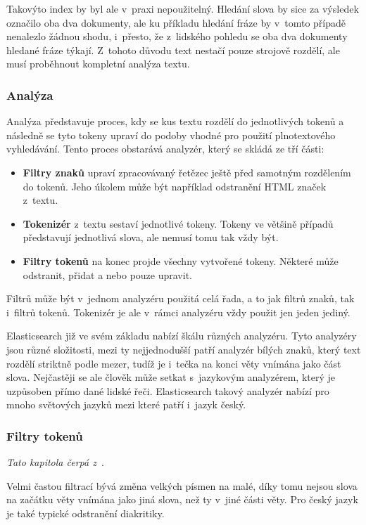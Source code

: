 Takovýto index by byl ale v~praxi nepoužitelný. Hledání slova  by sice za výsledek označilo oba dva dokumenty, ale ku příkladu hledání fráze  by v~tomto případě nenalezlo žádnou shodu, i~přesto, že z~lidského pohledu se oba dva dokumenty hledané fráze týkají. Z~tohoto důvodu text nestačí pouze strojově rozdělí, ale musí proběhnout kompletní analýza textu.

\subsubsection*{Analýza}
Analýza představuje proces, kdy se kus textu rozdělí do jednotlivých tokenů a následně se tyto tokeny upraví do podoby vhodné pro použití plnotextového vyhledávání. Tento proces obstarává analyzér, který se skládá ze tří části:
\begin{itemize}
    \item \textbf{Filtry znaků} upraví zpracovávaný řetězec ještě před samotným rozdělením do tokenů. Jeho úkolem může být například odstranění HTML značek z~textu.
    \item \textbf{Tokenizér} z~textu sestaví jednotlivé tokeny. Tokeny ve většině případů představují jednotlivá slova, ale nemusí tomu tak vždy být. 
    \item \textbf{Filtry tokenů} na konec projde všechny vytvořené tokeny. Některé může odstranit, přidat a nebo pouze upravit. 
\end{itemize}
Filtrů může být v~jednom analyzéru použitá celá řada, a to jak filtrů znaků, tak i~filtrů tokenů. Tokenizér je ale v~rámci analyzéru vždy použit jen jeden jediný.

Elasticsearch již ve svém základu nabízí škálu různých analyzéru. Tyto analyzéry jsou různé složitosti, mezi ty nejjednodušší patří analyzér bílých znaků, který text rozdělí striktně podle mezer, tudíž je i~tečka na konci věty vnímána jako část slova. Nejčastěji se ale člověk může setkat s~jazykovým analyzérem, který je uzpůsoben přímo dané lidské řeči. Elasticsearch takový analyzér nabízí pro mnoho světových jazyků mezi které patří i~jazyk český.

\subsubsection*{Filtry tokenů}
\emph{Tato kapitola čerpá z~\cite{bib:elastic-fulltext}}.

Velmi častou filtrací bývá změna velkých písmen na malé, díky tomu nejsou slova na začátku věty vnímána jako jiná slova, než ty v~jiné části věty. Pro český jazyk je také typické odstranění diakritiky.

